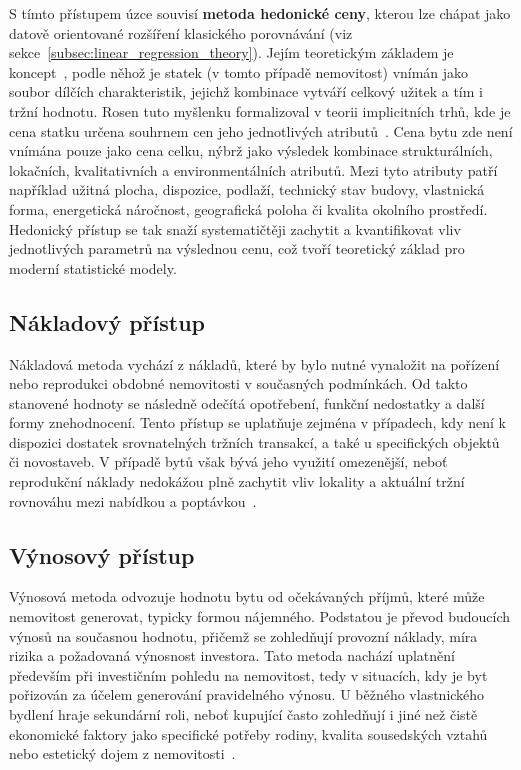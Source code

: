 S tímto přístupem úzce souvisí \textbf{metoda hedonické ceny}, kterou lze chápat jako datově orientované rozšíření klasického porovnávání (viz sekce~\ref{subsec:linear_regression_theory}). Jejím teoretickým základem je koncept~\cite{Lancaster1966}, podle něhož je statek (v tomto případě nemovitost) vnímán jako soubor dílčích charakteristik, jejichž kombinace vytváří celkový užitek a tím i tržní hodnotu. Rosen tuto myšlenku formalizoval v teorii implicitních trhů, kde je cena statku určena souhrnem cen jeho jednotlivých atributů~\cite{Rosen1974}. Cena bytu zde není vnímána pouze jako cena celku, nýbrž jako výsledek kombinace strukturálních, lokačních, kvalitativních a environmentálních atributů. Mezi tyto atributy patří například užitná plocha, dispozice, podlaží, technický stav budovy, vlastnická forma, energetická náročnost, geografická poloha či kvalita okolního prostředí. Hedonický přístup se tak snaží systematičtěji zachytit a kvantifikovat vliv jednotlivých parametrů na výslednou cenu, což tvoří teoretický základ pro moderní statistické modely.

\subsection*{Nákladový přístup}
Nákladová metoda vychází z nákladů, které by bylo nutné vynaložit na pořízení nebo reprodukci obdobné nemovitosti v současných podmínkách. Od takto stanovené hodnoty se následně odečítá opotřebení, funkční nedostatky a další formy znehodnocení. Tento přístup se uplatňuje zejména v případech, kdy není k dispozici dostatek srovnatelných tržních transakcí, a také u specifických objektů či novostaveb. V případě bytů však bývá jeho využití omezenější, neboť reprodukční náklady nedokážou plně zachytit vliv lokality a aktuální tržní rovnováhu mezi nabídkou a poptávkou~\cite{IVSC2022,CNB2024RezidencniTrh}.

\subsection*{Výnosový přístup}
Výnosová metoda odvozuje hodnotu bytu od očekávaných příjmů, které může nemovitost generovat, typicky formou nájemného. Podstatou je převod budoucích výnosů na současnou hodnotu, přičemž se zohledňují provozní náklady, míra rizika a požadovaná výnosnost investora. Tato metoda nachází uplatnění především při investičním pohledu na nemovitost, tedy v situacích, kdy je byt pořizován za účelem generování pravidelného výnosu. U běžného vlastnického bydlení hraje sekundární roli, neboť kupující často zohledňují i jiné než čistě ekonomické faktory jako specifické potřeby rodiny, kvalita sousedských vztahů nebo estetický dojem z nemovitosti~\cite{IVSC2022}.


